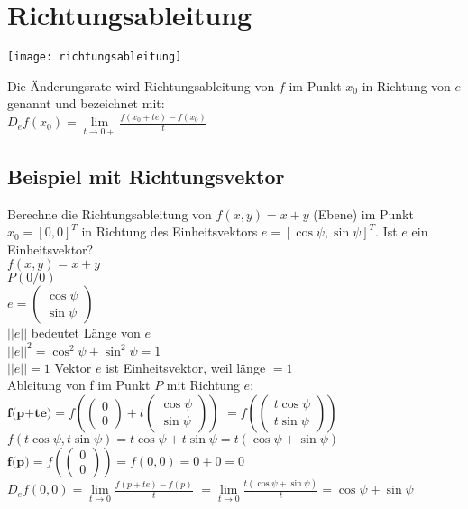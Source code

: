 \documentclass[../main.tex]{subfiles}
\begin{document}
\section{Richtungsableitung}
\begin{minipage}{0.45\textwidth}
    \texttt{[image: richtungsableitung]}
\end{minipage} \hfill
\begin{minipage}{0.5\textwidth}
    Die Änderungsrate wird Richtungsableitung von $f$ im Punkt $x_0$ in 
    Richtung von $e$ genannt und bezeichnet mit: \\ [7pt]
    $D_ef(x_0)=\lim\limits_{t\to 0+}\frac{f(x_0+te)-f(x_0)}{t}$
\end{minipage}

\subsection{Beispiel mit Richtungsvektor}
Berechne die Richtungsableitung von $f(x,y)=x+y$ (Ebene) im Punkt $x_0=[0,0]^T$ in Richtung
des Einheitsvektors $e=[\cos \psi, \sin \psi]^T$. Ist $e$ ein Einheitsvektor? \\
$f(x,y)=x+y$ \\ [7pt]
$P(0/0)$ \\ [7pt]
$e=\begin{pmatrix}\cos \psi \\\sin \psi\end{pmatrix}$ \\ [7pt]
$||e||$ bedeutet Länge von $e$ \\ [7pt]
$||e||^2=\cos^2\psi + \sin^2\psi=1$ \\ [7pt]
$||e||=1$ Vektor $e$ ist Einheitsvektor, weil länge $=1$\\ [7pt]
Ableitung von f im Punkt $P$ mit Richtung $e$: \\ [7pt]
$\textbf{f(p+te)}=f\left(\begin{pmatrix}0\\0\end{pmatrix} + t\begin{pmatrix}\cos \psi \\\sin \psi\end{pmatrix}\right)$
$=f\left(\begin{pmatrix}t\cos \psi \\t\sin \psi\end{pmatrix}\right)$
$f(t\cos\psi,t\sin\psi) = t\cos\psi + t\sin\psi = t(\cos\psi + \sin\psi) $ \\ [7pt]
$\textbf{f(p)}=f\left(\begin{pmatrix}0\\0\end{pmatrix}\right)=f(0,0)=0+0=0$  \\ [7pt]
$D_ef(0,0)=\lim\limits_{t \to 0}\frac{f(p+te)-f(p)}{t}$ 
$=\lim\limits_{t \to 0}\frac{t(\cos\psi + \sin\psi)}{t}=\cos\psi + \sin\psi$
\end{document}
